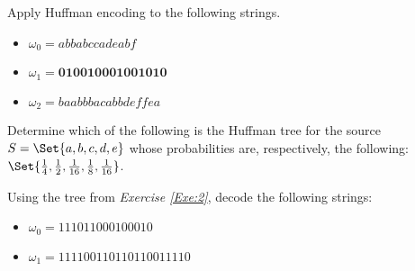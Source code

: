 \documentclass{subfiles}
\begin{document}
    \begin{exercise}\label{Exe:1}
        Apply Huffman encoding to the following strings.
        \begin{itemize}
            \item \(\omega_{0} = abbabccadeabf\)
            \item \(\omega_{1} = \textbf{010010001001010}\)
            \item \(\omega_{2} = baabbbacabbdeffea\)
        \end{itemize}
    \end{exercise}
    \begin{exercise}\label{Exe:2}
        Determine which of the following is the Huffman tree for the source 
            \(S = \Set{a, b, c, d, e}\) whose probabilities are,
        respectively, the following: 
            \(\Set{\tfrac{1}{4}, 
                \tfrac{1}{2},
                \tfrac{1}{16}, 
                \tfrac{1}{8}, 
                \tfrac{1}{16}}\).
        
    \end{exercise}
    \begin{exercise}
        Using the tree from \emph{Exercise \ref{Exe:2}},
        decode the following strings: 
        \begin{itemize}
            \item \(\omega_{0} = 111011000100010\)
            \item \(\omega_{1} = 111100110110110011110\) 
        \end{itemize}
    \end{exercise}
\end{document}
